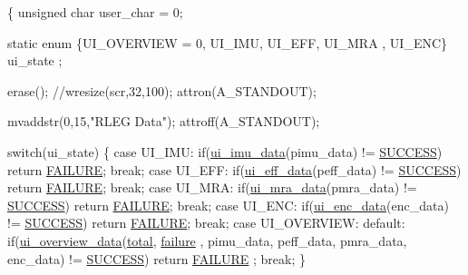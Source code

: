 \begin{DoxyCode}
\{
        \textcolor{keywordtype}{unsigned} \textcolor{keywordtype}{char} user\_char = 0;

        \textcolor{keyword}{static} \textcolor{keyword}{enum} \{UI\_OVERVIEW = 0, UI\_IMU, UI\_EFF, UI\_MRA , UI\_ENC\} ui\_state
      ;

        erase();
        \textcolor{comment}{//wresize(scr,32,100);}
        attron(A\_STANDOUT);

        mvaddstr(0,15,\textcolor{stringliteral}{"RLEG Data"});
        attroff(A\_STANDOUT);

        \textcolor{keywordflow}{switch}(ui\_state)
        \{
                \textcolor{keywordflow}{case} UI\_IMU:
                        \textcolor{keywordflow}{if}(\hyperlink{group__ui_ga7d5a9d9a75693709de408781d001a6a6}{ui\_imu\_data}(pimu\_data) != \hyperlink{calibration_2calibration_8h_aa90cac659d18e8ef6294c7ae337f6b58}{SUCCESS})
       \textcolor{keywordflow}{return} \hyperlink{calibration_2calibration_8h_a6d58f9ac447476b4e084d7ca383f5183}{FAILURE};
                        \textcolor{keywordflow}{break};
                \textcolor{keywordflow}{case} UI\_EFF:
                        \textcolor{keywordflow}{if}(\hyperlink{ui_8c_af48496a4ce54378764bc4ca9eddfd498}{ui\_eff\_data}(peff\_data) != \hyperlink{calibration_2calibration_8h_aa90cac659d18e8ef6294c7ae337f6b58}{SUCCESS})
       \textcolor{keywordflow}{return} \hyperlink{calibration_2calibration_8h_a6d58f9ac447476b4e084d7ca383f5183}{FAILURE};
                        \textcolor{keywordflow}{break};
                \textcolor{keywordflow}{case} UI\_MRA:
                        \textcolor{keywordflow}{if}(\hyperlink{group__ui_gaefec243c5df45db0350c1abbccf20e3b}{ui\_mra\_data}(pmra\_data) != \hyperlink{calibration_2calibration_8h_aa90cac659d18e8ef6294c7ae337f6b58}{SUCCESS})
       \textcolor{keywordflow}{return} \hyperlink{calibration_2calibration_8h_a6d58f9ac447476b4e084d7ca383f5183}{FAILURE};
                        \textcolor{keywordflow}{break};
                \textcolor{keywordflow}{case} UI\_ENC:
                        \textcolor{keywordflow}{if}(\hyperlink{ui_8c_a3821f6ba38465f8d170f7b947869e7d9}{ui\_enc\_data}(enc\_data) != \hyperlink{calibration_2calibration_8h_aa90cac659d18e8ef6294c7ae337f6b58}{SUCCESS}) \textcolor{keywordflow}{
      return} \hyperlink{calibration_2calibration_8h_a6d58f9ac447476b4e084d7ca383f5183}{FAILURE};
                        \textcolor{keywordflow}{break};
                \textcolor{keywordflow}{case} UI\_OVERVIEW:
                \textcolor{keywordflow}{default}:
                        \textcolor{keywordflow}{if}(\hyperlink{ui_8c_a8d5e19833fec51919aad6e78bb74619a}{ui\_overview\_data}(\hyperlink{main2_8c_ac7af894858cf396a219d632f40afdc8d}{total}, \hyperlink{main2_8c_a4f35e5ea2395561d0bd3b2f45612dc2c}{failure}
      , pimu\_data, peff\_data, pmra\_data, enc\_data) != \hyperlink{calibration_2calibration_8h_aa90cac659d18e8ef6294c7ae337f6b58}{SUCCESS}) \textcolor{keywordflow}{return} \hyperlink{calibration_2calibration_8h_a6d58f9ac447476b4e084d7ca383f5183}{FAILURE}
      ;
                        \textcolor{keywordflow}{break};
        \}


\end{DoxyCode}
